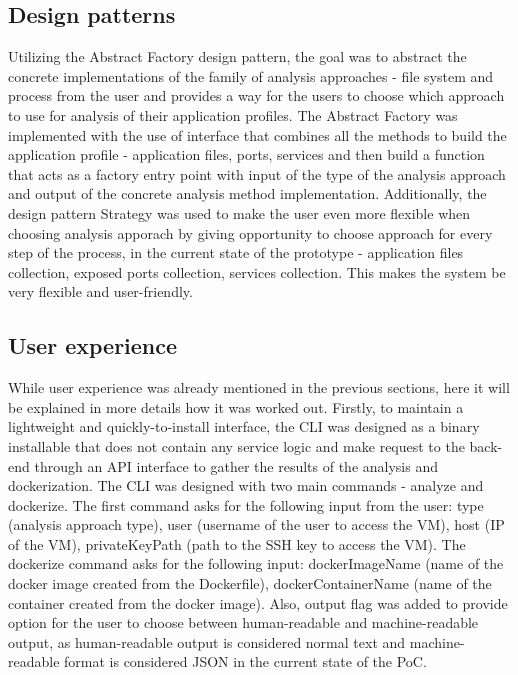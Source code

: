 \documentclass{article}
\begin{document}
\begin{multicols}{2}
\subsection{Design patterns}
Utilizing the Abstract Factory design pattern, the goal was to abstract the concrete implementations of the family of analysis approaches - file system and process from the user and provides a way for the users to choose which approach to use for analysis of their application profiles. The Abstract Factory was implemented with the use of interface that combines all the methods to build the application profile - application files, ports, services and then build a function that acts as a factory entry point with input of the type of the analysis approach and output of the concrete analysis method implementation.
Additionally, the design pattern Strategy was used to make the user even more flexible when choosing analysis apporach by giving opportunity to choose approach for every step of the process, in the current state of the prototype - application files collection, exposed ports collection, services collection. This makes the system be very flexible and user-friendly.

\subsection{User experience}
While user experience was already mentioned in the previous sections, here it will be explained in more details how it was worked out. Firstly, to maintain a lightweight and quickly-to-install interface, the CLI was designed as a binary installable that does not contain any service logic and make request to the back-end through an API interface to gather the results of the analysis and dockerization. The CLI was designed with two main commands - analyze and dockerize. The first command asks for the following input from the user: type (analysis approach type), user (username of the user to access the VM), host (IP of the VM), privateKeyPath (path to the SSH key to access the VM). The dockerize command asks for the following input: dockerImageName (name of the docker image created from the Dockerfile), dockerContainerName (name of the container created from the docker image). Also, output flag was added to provide option for the user to choose between human-readable and machine-readable output, as human-readable output is considered normal text and machine-readable format is considered JSON in the current state of the PoC.


\end{multicols}
\end{document}
